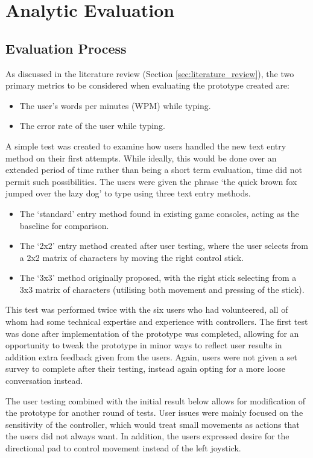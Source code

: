 \documentclass[evaluation.tex]{subfiles}
\begin{document}
\section{Analytic Evaluation} %
\label{sec:analytic_evaluation}
\subsection{Evaluation Process} %
\label{sub:evaluation_process}
As discussed in the literature review (Section \ref{sec:literature_review}), the
two primary metrics to be considered when evaluating the prototype created are:
\begin{itemize}
	\item The user's words per minutes (WPM) while typing.
	\item The error rate of the user while typing.
\end{itemize}

A simple test was created to examine how users handled the new text entry method
on their first attempts. While ideally, this would be done over an extended
period of time rather than being a short term evaluation, time did not permit
such possibilities. The users were given the phrase `the quick brown fox jumped
over the lazy dog' to type using three text entry methods.
\begin{itemize}
	\item The `standard' entry method found in existing game consoles, acting as
	the baseline for comparison.
	\item The `2x2' entry method created after user testing, where the user
	selects from a 2x2 matrix of characters by moving the right control stick.
	\item The `3x3' method originally proposed, with the right stick selecting
	from a 3x3 matrix of characters (utilising both movement and pressing of
	the stick).
\end{itemize}

This test was performed twice with the six users who had volunteered, all of
whom had some technical expertise and experience with controllers. The first
test was done after implementation of the prototype was completed, allowing for
an opportunity to tweak the prototype in minor ways to reflect user results in
addition extra feedback given from the users. Again, users were not given a
set survey to complete after their testing, instead again opting for a more
loose conversation instead.

The user testing combined with the initial result below allows for modification
of the prototype for another round of tests. User issues were mainly focused on
the sensitivity of the controller, which would treat small movements as actions
that the users did not always want. In addition, the users expressed desire for
the directional pad to control movement instead of the left joystick. 
\end{document}
